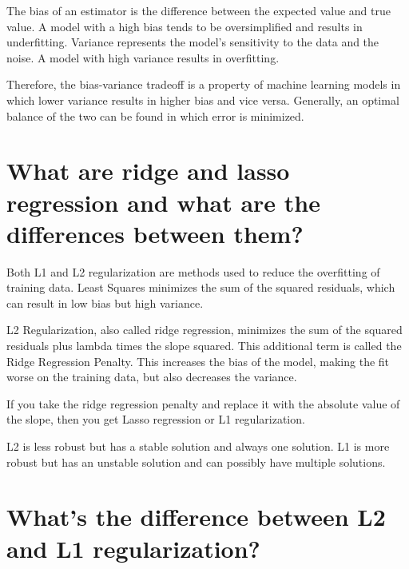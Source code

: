 \documentclass[
]{book}
\begin{document}
The bias of an estimator is the difference between the expected value and true value. A model with a high bias tends to be oversimplified and results in underfitting. Variance represents the model's sensitivity to the data and the noise. A model with high variance results in overfitting.

Therefore, the bias-variance tradeoff is a property of machine learning models in which lower variance results in higher bias and vice versa. Generally, an optimal balance of the two can be found in which error is minimized.

\hypertarget{what-are-ridge-and-lasso-regression-and-what-are-the-differences-between-them}{%
\section{What are ridge and lasso regression and what are the differences between them?}\label{what-are-ridge-and-lasso-regression-and-what-are-the-differences-between-them}}

Both L1 and L2 regularization are methods used to reduce the overfitting of training data. Least Squares minimizes the sum of the squared residuals, which can result in low bias but high variance.

L2 Regularization, also called ridge regression, minimizes the sum of the squared residuals plus lambda times the slope squared. This additional term is called the Ridge Regression Penalty. This increases the bias of the model, making the fit worse on the training data, but also decreases the variance.

If you take the ridge regression penalty and replace it with the absolute value of the slope, then you get Lasso regression or L1 regularization.

L2 is less robust but has a stable solution and always one solution. L1 is more robust but has an unstable solution and can possibly have multiple solutions.

\hypertarget{whats-the-difference-between-l2-and-l1-regularization}{%
\section{What's the difference between L2 and L1 regularization?}\label{whats-the-difference-between-l2-and-l1-regularization}}
\end{document}
